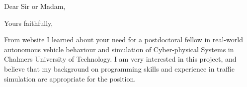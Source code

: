 \documentclass[11pt,a4paper,sans]{moderncv}        %
\begin{document}

\nocite{*}




\clearpage
\date{\today}
\opening{Dear Sir or Madam,}
\closing{Yours faithfully,}
\makelettertitle

From website I learned about your need for a postdoctoral fellow in real-world autonomous vehicle behaviour and simulation of Cyber-physical Systems in Chalmers University of Technology. I am very interested in this project, and believe that my background on programming skills and experience in traffic simulation are appropriate for the position. 
\end{document}
